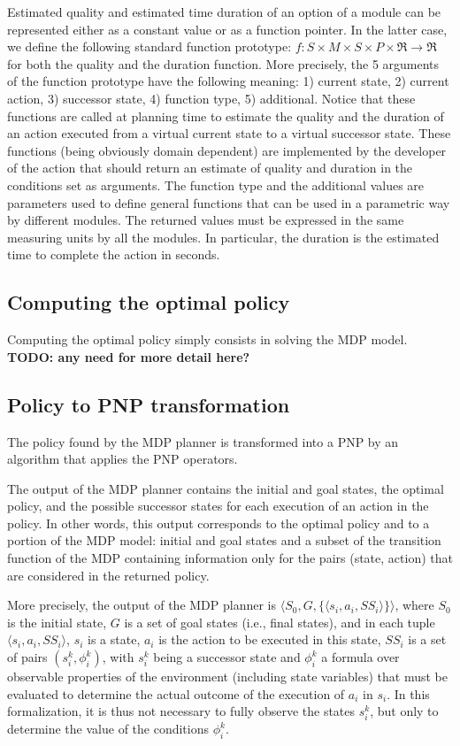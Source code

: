 Estimated quality and estimated time duration of an option of a module can be represented either as a constant value or as a function pointer. In the latter case, we define the following standard function prototype: $f : S \times M \times S \times P \times \Re \rightarrow \Re$ for both the quality and the duration function. More precisely, the 5 arguments of the function prototype have the following meaning: 1) current state, 2) current action, 3) successor state, 4) function type, 5) additional. Notice that these functions are called at planning time to estimate the quality and the duration of an action executed from a virtual current state to a virtual successor state. These functions (being obviously domain dependent) are implemented by the developer of the action that should return an estimate of quality and duration in the  conditions set as arguments. The function type and the additional values are parameters used to define general functions that can be used in a parametric way by different modules.
The returned values must be expressed in the same measuring units by all the modules. In particular, the duration is the estimated time to complete the action in seconds.

\subsection{Computing the optimal policy}

Computing the optimal policy simply consists in solving the MDP model.
{\bf TODO: any need for more detail here?}


\subsection{Policy to PNP transformation}

The policy found by the MDP planner is transformed into a PNP by an algorithm that applies the PNP operators. 

The output of the MDP planner contains the initial and goal states,  the optimal policy, and the possible successor states for each execution of an action in the policy. In other words, this output corresponds to the optimal policy and to a portion of the MDP model: initial and goal states and a subset of the transition function of the MDP containing information only for the pairs (state, action) that are considered in the returned policy.

More precisely, the output of the MDP planner is $\langle S_0, G, \{ \langle s_i, a_i, SS_i \rangle \} \rangle $,  
where $S_0$ is the initial state, $G$ is a set of goal states (i.e., final states),
and in each tuple $\langle s_i, a_i, SS_i \rangle$, $s_i$ is a state, $a_i$ is the action to be executed in this state, $SS_i$ is a set of pairs $(s_i^k, \phi_i^k)$, with $s_i^k$ being a successor state and $\phi_i^k$ a formula over observable properties of the environment (including state variables) that  must be evaluated to determine the actual outcome of the execution of $a_i$ in $s_i$.
In this formalization, it is thus not necessary to fully observe the states $s_i^k$, but only to determine the value of the conditions $\phi_i^k$.

